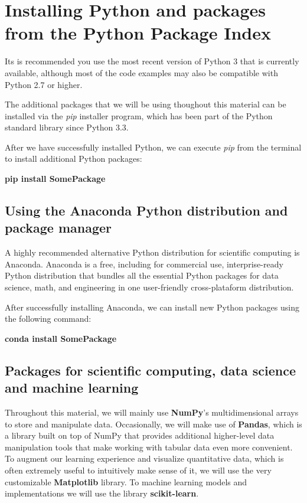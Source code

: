 \documentclass[11pt]{article}
\begin{document}
    \section{Installing Python and packages from the Python Package
Index}\label{installing-python-and-packages-from-the-python-package-index}

    Its is recommended you use the most recent version of Python 3 that is
currently available, although most of the code examples may also be
compatible with Python 2.7 or higher.

    The additional packages that we will be using thoughout this material
can be installed via the \emph{pip} installer program, which has been
part of the Python standard library since Python 3.3.

    After we have successfully installed Python, we can execute \emph{pip}
from the terminal to install additional Python packages:

\textbf{pip install SomePackage}

    \subsection{Using the Anaconda Python distribution and package
manager}\label{using-the-anaconda-python-distribution-and-package-manager}

    A highly recommended alternative Python distribution for scientific
computing is Anaconda. Anaconda is a free, including for commercial use,
interprise-ready Python distribution that bundles all the essential
Python packages for data science, math, and engineering in one
user-friendly cross-plataform distribution.

    After successfully installing Anaconda, we can install new Python
packages using the following command:

\textbf{conda install SomePackage}

    \subsection{Packages for scientific computing, data science and machine
learning}\label{packages-for-scientific-computing-data-science-and-machine-learning}

    Throughout this material, we will mainly use \textbf{NumPy}'s
multidimensional arrays to store and manipulate data. Occasionally, we
will make use of \textbf{Pandas}, which is a library built on top of
NumPy that provides additional higher-level data manipulation tools that
make working with tabular data even more convenient. To augment our
learning experience and visualize quantitative data, which is often
extremely useful to intuitively make sense of it, we will use the very
customizable \textbf{Matplotlib} library. To machine learning models and
implementations we will use the library \textbf{scikit-learn}.
\end{document}
